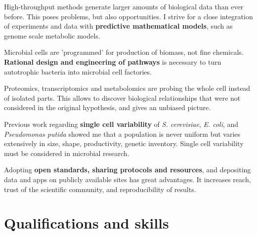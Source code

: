\documentclass[11pt, a4paper, sans, blue]{moderncv}
\begin{document}

{High-throughput methods generate larger amounts of biological data than ever before. This poses problems, but also opportunities. I strive for a close integration of experiments and data with \textbf{predictive mathematical models}, such as genome scale metabolic models.}

{Microbial cells are 'programmed' for production of biomass, not fine chemicals. \textbf{Rational design and engineering of pathways} is necessary to turn autotrophic bacteria into microbial cell factories.}

{Proteomics, transcriptomics and metabolomics are probing the whole cell instead of isolated parts. This allows to discover biological relationships that were not considered in the original hypothesis, and gives an unbiased picture.}

{Previous work regarding \textbf{single cell variability} of \textit{S. cerevisiae}, \textit{E. coli}, and \textit{Pseudomonas putida} showed me that a population is never uniform but varies extensively in size, shape, productivity, genetic inventory. Single cell variability must be considered in microbial research.}

{Adopting \textbf{open standards, sharing protocols and resources}, and depositing data and apps on publicly available sites has great advantages. It increases reach, trust of the scientific community, and reproducibility of results.}


\section{Qualifications and skills}
	
	
\end{document}
